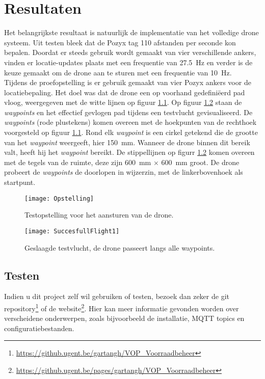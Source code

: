 \chapter{Resultaten}
Het belangrijkste resultaat is natuurlijk de implementatie van het volledige drone systeem.
Uit testen bleek dat de Pozyx tag 110 afstanden per seconde kon bepalen.
Doordat er steeds gebruik wordt gemaakt van vier verschillende ankers, vinden er locatie-updates plaats met een frequentie van \SI{27.5}{\Hz} en verder is de keuze gemaakt om de drone aan te sturen met een frequentie van \SI{10}{\Hz}.\\

Tijdens de proefopstelling is er gebruik gemaakt van vier Pozyx ankers voor de locatiebepaling.
Het doel was dat de drone een op voorhand gedefini\"eerd pad vloog, weergegeven met de witte lijnen op figuur \ref{fig:Opstelling}.
Op figuur \ref{fig:SuccesfullFlight1} staan de \textit{waypoints} en het effectief gevlogen pad tijdens een testvlucht gevisualiseerd.
De \textit{waypoints} (rode plustekens) komen overeen met de hoekpunten van de rechthoek voorgesteld op figuur \ref{fig:Opstelling}.
Rond elk \textit{waypoint} is een cirkel getekend die de grootte van het \textit{waypoint} weergeeft, hier \SI{150}{\mm}.
Wanneer de drone binnen dit bereik valt, heeft hij het \textit{waypoint} bereikt.
De stippellijnen op figurr \ref{fig:SuccesfullFlight1} komen overeen met de tegels van de ruimte, deze zijn \SI{600}{\mm} $\times$ \SI{600}{\mm} groot.
De drone probeert de \textit{waypoints} de doorlopen in wijzerzin, met de linkerbovenhoek als startpunt. 
\begin{figure}[p]
	\centering
	\texttt{[image: Opstelling]}
	\caption[Opstelling testvluchten]{Testopstelling voor het aansturen van de drone.}
	\label{fig:Opstelling}
\end{figure}

\begin{figure}[p]	
	\centering
	\texttt{[image: SuccesfullFlight1]}
	\caption[Geslaagde testvlucht]{Geslaagde testvlucht, de drone passeert langs alle waypoints.}
	\label{fig:SuccesfullFlight1}
\end{figure}

\section{Testen} \label{sec:test}
Indien u dit project zelf wil gebruiken of testen, bezoek dan zeker de git repository\footnote{\url{https://github.ugent.be/gartangh/VOP_Voorraadbeheer}} of de website\footnote{\url{https://github.ugent.be/pages/gartangh/VOP_Voorraadbeheer}}.
Hier kan meer informatie gevonden worden over verscheidene onderwerpen, zoals bijvoorbeeld de installatie, MQTT topics en configuratiebestanden.

